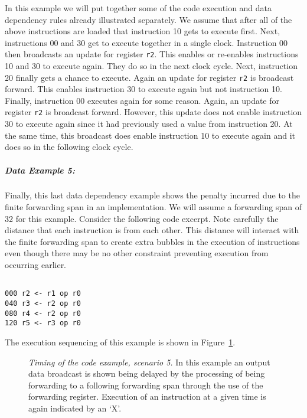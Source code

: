 \documentclass[10pt,dvips]{article}
\begin{document}
In this example we will put together some of the
code execution and data dependency rules already illustrated
separately.
We assume that after all of the above instructions are loaded
that instruction 10 gets to execute first.
Next, instructions 00 and 30 get to execute together in a single
clock.  Instruction 00 then broadcasts an update for register
{\tt r2}.
This enables or re-enables instructions 10 and 30 to execute again.
They do so in the next clock cycle.  Next, instruction 20 finally
gets a chance to execute.  Again an update for register
{\tt r2}
is broadcast forward.  This enables instruction 30 to execute again
but not instruction 10.
Finally, instruction 00 executes again for some reason.
Again, an update for register
{\tt r2}
is broadcast forward.  However, this update does not enable
instruction 30 to execute again since it had previously used
a value from instruction 20.  At the same time, this broadcast does
enable instruction 10 to execute again and it does so in the following
clock cycle.


\subparagraph{Data Example 5: }
Finally, this last data dependency example shows the
penalty incurred due to the finite forwarding span
in an implementation.  We will assume a forwarding span
of 32 for this example.  Consider the following
code excerpt.  Note carefully the distance that each instruction
is from each other.  This distance will interact with
the finite forwarding span to create extra bubbles in
the execution of instructions even though there may be no other
constraint preventing execution from occurring earlier.

\begin{verbatim}

000	r2 <- r1 op r0
040	r3 <- r2 op r0
080	r4 <- r2 op r0
120	r5 <- r3 op r0

\end{verbatim}

The execution sequencing of this example is shown in
Figure~\ref{ex5}.

\begin{figure}
\centering
{}
\caption{{\em Timing of the code example, scenario 5.}
In this example an output data broadcast is shown being
delayed by the processing of being forwarding
to a following forwarding span through the use
of the forwarding register.
Execution of an instruction at a given time is
again indicated by an `X'.}
\label{ex5}
\end{figure}
\end{document}
